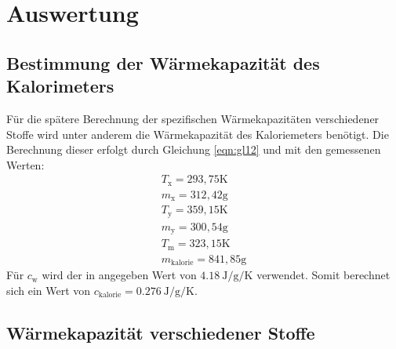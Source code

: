 \section{Auswertung}
\label{sec:Auswertung}

\subsection{Bestimmung der Wärmekapazität des Kalorimeters}
\label{sec:Kalorie}
Für die spätere Berechnung der spezifischen Wärmekapazitäten verschiedener Stoffe wird unter anderem die Wärmekapazität des Kaloriemeters benötigt.
Die Berechnung dieser erfolgt durch Gleichung \eqref{eqn:gl12} und mit den gemessenen Werten:
\begin{align*}
 T_\text{x} = 293,75 \text{K}\\
 m_\text{x} = 312,42 \text{g}\\
 T_\text{y} = 359,15 \text{K}\\
 m_\text{y} = 300,54 \text{g}\\
 T_\text{m} = 323,15 \text{K}\\
 m_\text{kalorie} = 841,85 \text{g}
\end{align*}
Für $c_\text{w}$ wird der in \cite{V201} angegeben Wert von $\SI{4,18}{\joule\per\gram\per\kelvin}$ verwendet.
Somit berechnet sich ein Wert von $ c_\text{kalorie} = \SI{0,276}{\joule\per\gram\per\kelvin}.$

\subsection{Wärmekapazität verschiedener Stoffe}
\label{sec:verschiedeneStoffe}

